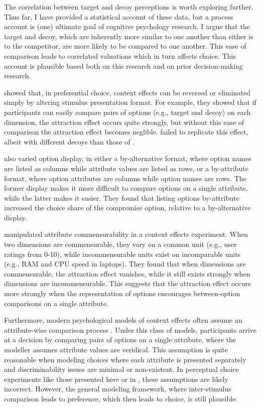 The correlation between target and decoy perceptions is worth exploring further. Thus far, I have provided a statistical account of these data, but a process account is (one) ultimate goal of cognitive psychology research. I argue that the target and decoy, which are inherently more similar to one another than either is to the competitor, are more likely to be compared to one another. This ease of comparison leads to correlated valuations which in turn affects choice. This account is plausible based both on this research and on prior decision-making research.

\textcite{cataldoComparisonProcessAccount2019b} showed that, in preferential choice, context effects can be reversed or eliminated simply by altering stimulus presentation format. For example, they showed that if participants can easily compare pairs of options (e.g., target and decoy) on each dimension, the attraction effect occurs quite strongly, but without this ease of comparison the attraction effect becomes neglible. \textcite{hasan2025registered} failed to replicate this effect, albeit with different decoys than those of \textcite{cataldoComparisonProcessAccount2019b}. 

\textcite{changWhichCompromiseOption2008} also varied option display, in either a by-alternative format, where option names are listed as columns while attribute values are listed as rows, or a by-attribute format, where option attributes are columns while option names are rows. The former display makes it more difficult to compare options on a single attribute, while the latter makes it easier. They found that listing options by-attribute increased the choice share of the compromise option, relative to a by-alternative display. 

\textcite{hayes2024attribute} manipulated attribute commensurability in a context effects experiment. When two dimensions are commensurable, they vary on a common unit (e.g., user ratings from 0-10), while incommensurable units exist on incomparable units (e.g., RAM and CPU speed in laptops). They found that when dimensions are commensurable, the attraction effect vanishes, while it still exists strongly when dimensions are incommensurable. This suggests that the attraction effect occurs more strongly when the representation of options encourages between-option comparisons on a single attribute.

Furthermore, modern psychological models of context effects often assume an attribute-wise comparison process \parencite{roeMultialternativeDecisionField2001a,trueblood2013not,usherLossAversionInhibition2004a,bhatiaAssociationsAccumulationPreference2013b}. Under this class of models, participants arrive at a decision by comparing pairs of options on a single attribute, where the modeller assumes attribute values are veridical. This assumption is quite reasonable when modeling choices where each attribute is presented separately and discriminability issues are minimal or non-existent. In perceptual choice experiments like those presented here or in \textcite{spektorWhenGoodLooks2018b,trueblood2013not}, these assumptions are likely incorrect. However, the general modeling framework, where inter-stimulus comparison leads to preference, which then leads to choice, is still plausible.

